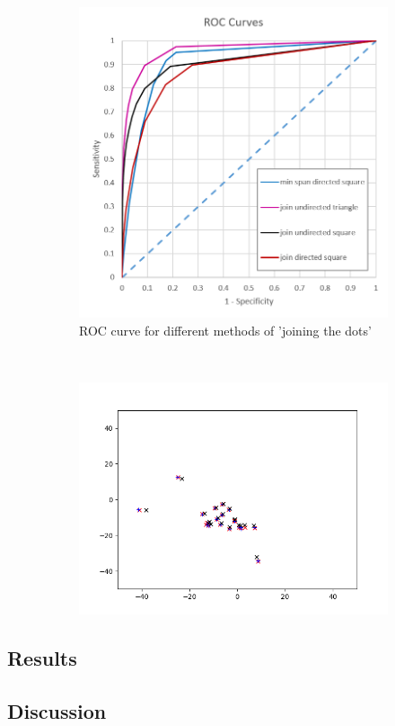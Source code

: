 \begin{figure}[h] %
\centering
\begin{subfigure}[t]{0.45\textwidth}
\centering
\includegraphics[width=\textwidth]{Figs/ROC_2.png}
\caption{ROC curve for different methods of 'joining the dots'} 
\label{fig:ROC_2} 
\end{subfigure}
~
\begin{subfigure}[t]{0.45\textwidth}
\includegraphics[width=\textwidth]{Figs/layers-686-736}
\caption{} 
\label{fig:layers-686-736}
\end{subfigure}
\end{figure}

\subsection{Results}

\subsection{Discussion}